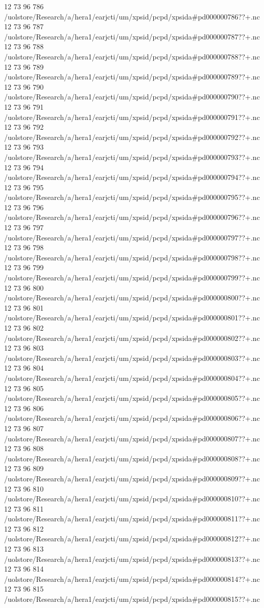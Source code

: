 12 73 96
786
/uolstore/Research/a/hera1/earjcti/um/xpsid/pcpd/xpsida#pd000000786??+.nc
12 73 96
787
/uolstore/Research/a/hera1/earjcti/um/xpsid/pcpd/xpsida#pd000000787??+.nc
12 73 96
788
/uolstore/Research/a/hera1/earjcti/um/xpsid/pcpd/xpsida#pd000000788??+.nc
12 73 96
789
/uolstore/Research/a/hera1/earjcti/um/xpsid/pcpd/xpsida#pd000000789??+.nc
12 73 96
790
/uolstore/Research/a/hera1/earjcti/um/xpsid/pcpd/xpsida#pd000000790??+.nc
12 73 96
791
/uolstore/Research/a/hera1/earjcti/um/xpsid/pcpd/xpsida#pd000000791??+.nc
12 73 96
792
/uolstore/Research/a/hera1/earjcti/um/xpsid/pcpd/xpsida#pd000000792??+.nc
12 73 96
793
/uolstore/Research/a/hera1/earjcti/um/xpsid/pcpd/xpsida#pd000000793??+.nc
12 73 96
794
/uolstore/Research/a/hera1/earjcti/um/xpsid/pcpd/xpsida#pd000000794??+.nc
12 73 96
795
/uolstore/Research/a/hera1/earjcti/um/xpsid/pcpd/xpsida#pd000000795??+.nc
12 73 96
796
/uolstore/Research/a/hera1/earjcti/um/xpsid/pcpd/xpsida#pd000000796??+.nc
12 73 96
797
/uolstore/Research/a/hera1/earjcti/um/xpsid/pcpd/xpsida#pd000000797??+.nc
12 73 96
798
/uolstore/Research/a/hera1/earjcti/um/xpsid/pcpd/xpsida#pd000000798??+.nc
12 73 96
799
/uolstore/Research/a/hera1/earjcti/um/xpsid/pcpd/xpsida#pd000000799??+.nc
12 73 96
800
/uolstore/Research/a/hera1/earjcti/um/xpsid/pcpd/xpsida#pd000000800??+.nc
12 73 96
801
/uolstore/Research/a/hera1/earjcti/um/xpsid/pcpd/xpsida#pd000000801??+.nc
12 73 96
802
/uolstore/Research/a/hera1/earjcti/um/xpsid/pcpd/xpsida#pd000000802??+.nc
12 73 96
803
/uolstore/Research/a/hera1/earjcti/um/xpsid/pcpd/xpsida#pd000000803??+.nc
12 73 96
804
/uolstore/Research/a/hera1/earjcti/um/xpsid/pcpd/xpsida#pd000000804??+.nc
12 73 96
805
/uolstore/Research/a/hera1/earjcti/um/xpsid/pcpd/xpsida#pd000000805??+.nc
12 73 96
806
/uolstore/Research/a/hera1/earjcti/um/xpsid/pcpd/xpsida#pd000000806??+.nc
12 73 96
807
/uolstore/Research/a/hera1/earjcti/um/xpsid/pcpd/xpsida#pd000000807??+.nc
12 73 96
808
/uolstore/Research/a/hera1/earjcti/um/xpsid/pcpd/xpsida#pd000000808??+.nc
12 73 96
809
/uolstore/Research/a/hera1/earjcti/um/xpsid/pcpd/xpsida#pd000000809??+.nc
12 73 96
810
/uolstore/Research/a/hera1/earjcti/um/xpsid/pcpd/xpsida#pd000000810??+.nc
12 73 96
811
/uolstore/Research/a/hera1/earjcti/um/xpsid/pcpd/xpsida#pd000000811??+.nc
12 73 96
812
/uolstore/Research/a/hera1/earjcti/um/xpsid/pcpd/xpsida#pd000000812??+.nc
12 73 96
813
/uolstore/Research/a/hera1/earjcti/um/xpsid/pcpd/xpsida#pd000000813??+.nc
12 73 96
814
/uolstore/Research/a/hera1/earjcti/um/xpsid/pcpd/xpsida#pd000000814??+.nc
12 73 96
815
/uolstore/Research/a/hera1/earjcti/um/xpsid/pcpd/xpsida#pd000000815??+.nc
